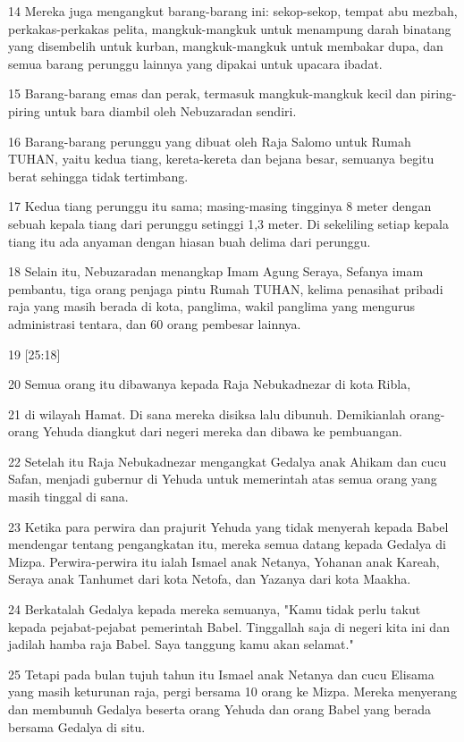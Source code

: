 \par 14 Mereka juga mengangkut barang-barang ini: sekop-sekop, tempat abu mezbah, perkakas-perkakas pelita, mangkuk-mangkuk untuk menampung darah binatang yang disembelih untuk kurban, mangkuk-mangkuk untuk membakar dupa, dan semua barang perunggu lainnya yang dipakai untuk upacara ibadat.
\par 15 Barang-barang emas dan perak, termasuk mangkuk-mangkuk kecil dan piring-piring untuk bara diambil oleh Nebuzaradan sendiri.
\par 16 Barang-barang perunggu yang dibuat oleh Raja Salomo untuk Rumah TUHAN, yaitu kedua tiang, kereta-kereta dan bejana besar, semuanya begitu berat sehingga tidak tertimbang.
\par 17 Kedua tiang perunggu itu sama; masing-masing tingginya 8 meter dengan sebuah kepala tiang dari perunggu setinggi 1,3 meter. Di sekeliling setiap kepala tiang itu ada anyaman dengan hiasan buah delima dari perunggu.
\par 18 Selain itu, Nebuzaradan menangkap Imam Agung Seraya, Sefanya imam pembantu, tiga orang penjaga pintu Rumah TUHAN, kelima penasihat pribadi raja yang masih berada di kota, panglima, wakil panglima yang mengurus administrasi tentara, dan 60 orang pembesar lainnya.
\par 19 [25:18]
\par 20 Semua orang itu dibawanya kepada Raja Nebukadnezar di kota Ribla,
\par 21 di wilayah Hamat. Di sana mereka disiksa lalu dibunuh. Demikianlah orang-orang Yehuda diangkut dari negeri mereka dan dibawa ke pembuangan.
\par 22 Setelah itu Raja Nebukadnezar mengangkat Gedalya anak Ahikam dan cucu Safan, menjadi gubernur di Yehuda untuk memerintah atas semua orang yang masih tinggal di sana.
\par 23 Ketika para perwira dan prajurit Yehuda yang tidak menyerah kepada Babel mendengar tentang pengangkatan itu, mereka semua datang kepada Gedalya di Mizpa. Perwira-perwira itu ialah Ismael anak Netanya, Yohanan anak Kareah, Seraya anak Tanhumet dari kota Netofa, dan Yazanya dari kota Maakha.
\par 24 Berkatalah Gedalya kepada mereka semuanya, "Kamu tidak perlu takut kepada pejabat-pejabat pemerintah Babel. Tinggallah saja di negeri kita ini dan jadilah hamba raja Babel. Saya tanggung kamu akan selamat."
\par 25 Tetapi pada bulan tujuh tahun itu Ismael anak Netanya dan cucu Elisama yang masih keturunan raja, pergi bersama 10 orang ke Mizpa. Mereka menyerang dan membunuh Gedalya beserta orang Yehuda dan orang Babel yang berada bersama Gedalya di situ.
